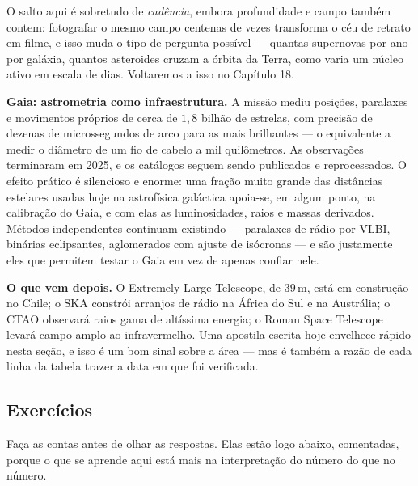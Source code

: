 \documentclass[11pt,a4paper]{article}
\begin{document}
O salto aqui é sobretudo de \emph{cadência}, embora profundidade e campo também contem: fotografar o mesmo campo
centenas de vezes transforma o céu de retrato em filme, e isso muda o tipo de pergunta possível --- quantas
supernovas por ano por galáxia, quantos asteroides cruzam a órbita da Terra, como varia um núcleo ativo em escala
de dias. Voltaremos a isso no Capítulo 18.

\textbf{Gaia: astrometria como infraestrutura.} A missão mediu posições, paralaxes e movimentos próprios de cerca
de $1{,}8$ bilhão de estrelas, com precisão de dezenas de microssegundos de arco para as mais brilhantes --- o
equivalente a medir o diâmetro de um fio de cabelo a mil quilômetros. As observações terminaram em 2025, e os
catálogos seguem sendo publicados e reprocessados. O efeito prático é silencioso e enorme: uma fração muito
grande das distâncias estelares usadas hoje na astrofísica galáctica apoia-se, em algum ponto, na calibração do
Gaia, e com elas as luminosidades, raios e massas derivados. Métodos independentes continuam existindo ---
paralaxes de rádio por VLBI, binárias eclipsantes, aglomerados com ajuste de isócronas --- e são justamente eles
que permitem testar o Gaia em vez de apenas confiar nele.

\textbf{O que vem depois.} O Extremely Large Telescope, de $39\,\mathrm{m}$, está em construção no Chile; o SKA
constrói arranjos de rádio na África do Sul e na Austrália; o CTAO observará raios gama de altíssima energia; o
Roman Space Telescope levará campo amplo ao infravermelho. Uma apostila escrita hoje envelhece rápido nesta
seção, e isso é um bom sinal sobre a área --- mas é também a razão de cada linha da tabela trazer a data em que
foi verificada.

\subsection*{Exercícios}

Faça as contas antes de olhar as respostas. Elas estão logo abaixo, comentadas, porque o que se aprende aqui está
mais na interpretação do número do que no número.
\end{document}
